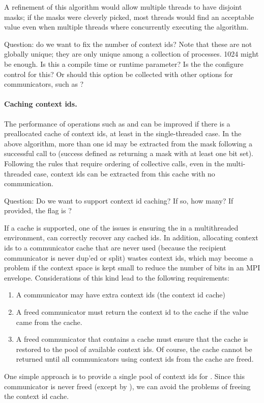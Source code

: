 \documentclass{article}
\begin{document}
A refinement of this algorithm would allow multiple threads to have
disjoint masks; if the masks were cleverly picked, most threads would
find an acceptable value even when multiple threads where concurrently
executing the algorithm.

Question: do we want to fix the number of context ids?  Note that
these are not globally unique; they are only unique among a collection
of processes.  1024 might be enough.  Is this a compile time or
runtime parameter?  Is the  the configure
control for this?  Or should this option be collected with other
options for communicators, such as
?

\paragraph{Caching context ids.} 
The performance of operations such as  and
 can be improved if there is a preallocated cache of
context ids, at least in the single-threaded case.  In the above
algorithm, more than one id may be extracted from the mask following a
successful call to  (success defined as
returning a mask with at least one bit set).  Following the rules that
require ordering of collective calls, even in the multi-threaded case,
context ids can be extracted from this cache with no communication.

Question: Do we want to support context id caching?  If so, how many?
If provided, the  flag is
? 

If a cache is supported, one of the issues is ensuring the in a
multithreaded environment,  can correctly
recover any cached ids.  In addition, allocating context ids to a
communicator cache that are never used (because the recipient
communicator is never dup'ed or split) wastes context ids, which may
become a problem if the context space is kept small to reduce the
number of bits in an MPI envelope.  Considerations of this kind lead
to the following requirements:
\begin{enumerate}
\item A communicator may have extra context ids (the context id cache)
\item A freed communicator must return the context id to the cache if
  the value came from the cache.
\item A freed communicator that contains a cache must ensure that the
  cache is restored to the pool of available context ids.  Of course,
  the cache cannot be returned until all communicators using context
  ids from the cache are freed.
\end{enumerate}
One simple approach is to provide a single pool of context ids for
.  Since this communicator is never freed (except
by ), we can avoid the problems of freeing the
context id cache.
\end{document}
